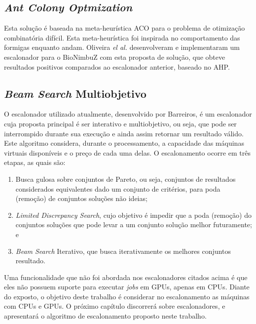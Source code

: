 \subsection{\textit{Ant Colony Optmization}}
Esta solução é baseada na meta-heurística \acrfull{ACO}\cite{ACO_DORIGO2005243} para o problema de otimização combinatória difícil. Esta meta-heurística foi inspirada no comportamento das formigas enquanto andam. Oliveira \textit{el al.}\cite{6732620_BioNimbuZ_ACOsched} desenvolveram e implementaram um escalonador para o BioNimbuZ com esta proposta de solução, que obteve resultados positivos comparados ao escalonador anterior, baseado no \acrshort{AHP}.

\subsection{\textit{Beam Search} Multiobjetivo}
O escalonador utilizado atualmente, desenvolvido por Barreiros\cite{BioNimbuZ_Willian_C99}, é um escalonador cuja proposta principal é ser interativo e multiobjetivo, ou seja, que pode ser interrompido durante sua execução e ainda assim retornar um resultado válido. Este algoritmo considera, durante o processamento, a capacidade das máquinas virtuais disponíveis e o preço de cada uma delas. O escalonamento ocorre em três etapas, as quais são:
\begin{enumerate}
	\item Busca gulosa sobre conjuntos de Pareto, ou seja, conjuntos de resultados considerados equivalentes dado um conjunto de critérios, para poda (remoção) de conjuntos soluções não ideias;
	\item \textit{Limited Discrepancy Search}\cite{Harvey:1995:LDS:1625855.1625935}, cujo objetivo é impedir que a poda (remoção) do conjuntos soluções que pode levar a um conjunto solução melhor futuramente; e
	\item \textit{Beam Search} Iterativo, que busca iterativamente os melhores conjuntos resultado.
\end{enumerate}

Uma funcionalidade que não foi abordada nos escalonadores citados acima é que eles não possuem suporte para executar \textit{jobs} em \acrshort{GPU}s, apenas em \acrshort{CPU}s. Diante do exposto, o objetivo deste trabalho é considerar no escalonamento as máquinas com \acrshort{CPU}s e \acrshort{GPU}s. O próximo capítulo discorrerá sobre escalonadores, e apresentará o algoritmo de escalonamento proposto neste trabalho.